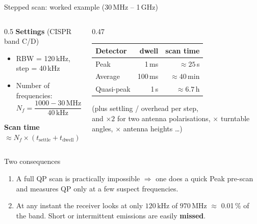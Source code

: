 \documentclass[aspectratio=169]{beamer}
\begin{document}
\begin{frame}{Stepped scan: worked example (30\,MHz -- 1\,GHz)}

\begin{columns}[T]
\begin{column}{0.5\textwidth}
  \textbf{Settings} (CISPR band C/D)
  \begin{itemize}
    \item RBW = 120\,kHz, step = 40\,kHz
    \item Number of frequencies:
      \[
        N_f = \frac{1000 - 30\,\mathrm{MHz}}{40\,\mathrm{kHz}} \approx 24\,250
      \]
  \end{itemize}

  \textbf{Scan time} $\approx N_f \times (t_\text{settle} + t_\text{dwell})$
\end{column}
\begin{column}{0.47\textwidth}
  \centering
  \begin{tabular}{@{}lrr@{}}
    \toprule
    Detector & dwell & scan time \\
    \midrule
    Peak       & 1\,ms   & $\approx 25$\,s \\
    Average    & 100\,ms & $\approx 40$\,min \\
    Quasi-peak & 1\,s    & \alert{$\approx 6.7$\,h} \\
    \bottomrule
  \end{tabular}

  \medskip
  \scriptsize (plus settling / overhead per step,\\and $\times 2$ for two
  antenna polarisations, $\times$ turntable angles, $\times$ antenna heights \dots)
\end{column}
\end{columns}

\bigskip
\begin{alertblock}{Two consequences}
  \begin{enumerate}
    \item A full QP scan is practically impossible $\Rightarrow$ one does a quick
          Peak pre-scan and measures QP only at a few suspect frequencies.
    \item At any instant the receiver looks at only $120\,\mathrm{kHz}$ of
          $970\,\mathrm{MHz}$ $\approx$ \alert{0.01\,\%} of the band.
          Short or intermittent emissions are easily \textbf{missed}.
  \end{enumerate}
\end{alertblock}

\end{frame}
\end{document}
